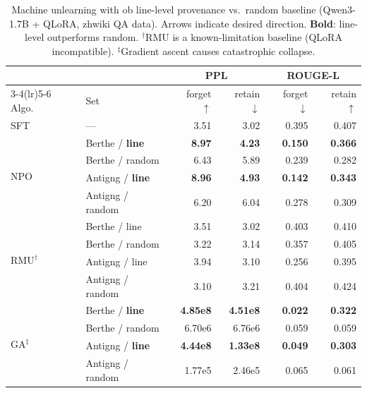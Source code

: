 \begin{table}[t]
	\centering
	\footnotesize
	\caption{Machine unlearning with ob line-level provenance vs.\ random baseline (Qwen3-1.7B + QLoRA, zhwiki QA data). Arrows indicate desired direction. \textbf{Bold}: line-level outperforms random. $^\dagger$RMU is a known-limitation baseline (QLoRA incompatible). $^\ddagger$Gradient ascent causes catastrophic collapse.}
	\label{tab:unlearning}
	\setlength{\tabcolsep}{1.5pt}
	\begin{tabular}{@{}llrrrr@{}}
		\toprule
		& & \multicolumn{2}{c}{PPL} & \multicolumn{2}{c}{ROUGE-L} \\
		\cmidrule(lr){3-4}\cmidrule(lr){5-6}
		Algo. & Set & forget $\uparrow$ & retain $\downarrow$ & forget $\downarrow$ & retain $\uparrow$ \\
		\midrule
		SFT & --- & 3.51 & 3.02 & 0.395 & 0.407 \\
		\midrule
		\multirow{4}{*}{NPO}
		& Berthe / \textbf{line}   & \textbf{8.97} & \textbf{4.23} & \textbf{0.150} & \textbf{0.366} \\
		& Berthe / random          & 6.43 & 5.89 & 0.239 & 0.282 \\
		& Antigng / \textbf{line}  & \textbf{8.96} & \textbf{4.93} & \textbf{0.142} & \textbf{0.343} \\
		& Antigng / random         & 6.20 & 6.04 & 0.278 & 0.309 \\
		\midrule
		\multirow{4}{*}{RMU$^\dagger$}
		& Berthe / line       & 3.51 & 3.02 & 0.403 & 0.410 \\
		& Berthe / random     & 3.22 & 3.14 & 0.357 & 0.405 \\
		& Antigng / line      & 3.94 & 3.10 & 0.256 & 0.395 \\
		& Antigng / random    & 3.10 & 3.21 & 0.404 & 0.424 \\
		\midrule
		\multirow{4}{*}{GA$^\ddagger$}
		& Berthe / \textbf{line}   & \textbf{4.85e8} & \textbf{4.51e8} & \textbf{0.022} & \textbf{0.322} \\
		& Berthe / random          & 6.70e6 & 6.76e6 & 0.059 & 0.059 \\
		& Antigng / \textbf{line}  & \textbf{4.44e8} & \textbf{1.33e8} & \textbf{0.049} & \textbf{0.303} \\
		& Antigng / random         & 1.77e5 & 2.46e5 & 0.065 & 0.061 \\
		\bottomrule
	\end{tabular}
\end{table}
